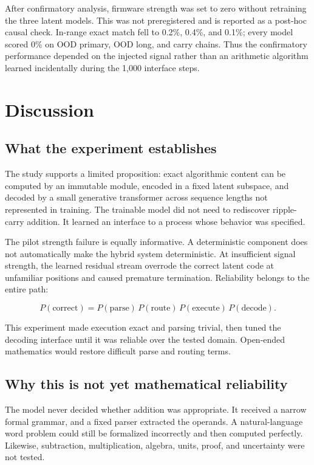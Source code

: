 \documentclass[11pt]{article}
\begin{document}
After confirmatory analysis, firmware strength was set to zero without
retraining the three latent models. This was not preregistered and is reported
as a post-hoc causal check. In-range exact match fell to 0.2\%, 0.4\%, and
0.1\%; every model scored 0\% on OOD primary, OOD long, and carry chains.
Thus the confirmatory performance depended on the injected signal rather than
an arithmetic algorithm learned incidentally during the 1{,}000 interface
steps.

\section{Discussion}

\subsection{What the experiment establishes}

The study supports a limited proposition: exact algorithmic content can be
computed by an immutable module, encoded in a fixed latent subspace, and
decoded by a small generative transformer across sequence lengths not
represented in training. The trainable model did not need to rediscover
ripple-carry addition. It learned an interface to a process whose behavior was
specified.

The pilot strength failure is equally informative. A deterministic component
does not automatically make the hybrid system deterministic. At insufficient
signal strength, the learned residual stream overrode the correct latent code
at unfamiliar positions and caused premature termination. Reliability belongs
to the entire path:

\[
P(\text{correct}) =
P(\text{parse})\,
P(\text{route})\,
P(\text{execute})\,
P(\text{decode}).
\]

This experiment made execution exact and parsing trivial, then tuned the
decoding interface until it was reliable over the tested domain. Open-ended
mathematics would restore difficult parse and routing terms.

\subsection{Why this is not yet mathematical reliability}

The model never decided whether addition was appropriate. It received a narrow
formal grammar, and a fixed parser extracted the operands. A natural-language
word problem could still be formalized incorrectly and then computed perfectly.
Likewise, subtraction, multiplication, algebra, units, proof, and uncertainty
were not tested.
\end{document}
